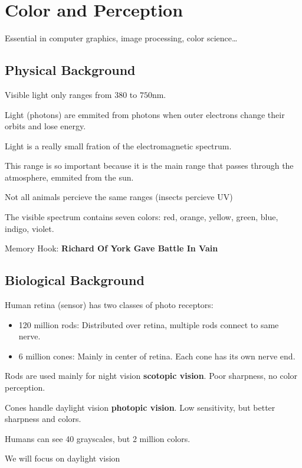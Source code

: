 \documentclass{article}
\begin{document}

\section{Color and Perception}

Essential in computer graphics, image processing, color science\dots

\subsection{Physical Background}

Visible light only ranges from $380$ to $750$nm.

Light (photons) are emmited from photons when outer electrons change their orbits and lose energy.

Light is a really small fration of the electromagnetic spectrum.

This range is so important because it is the main range that passes through the atmosphere, emmited from the sun.

Not all animals percieve the same ranges (insects percieve UV)

The visible spectrum contains seven colors: red, orange, yellow, green, blue, indigo, violet.

Memory Hook: \textbf{Richard Of York Gave Battle In Vain}

\subsection{Biological Background}

Human retina (sensor) has two classes of photo receptors:
\begin{itemize}
  \item 120 million rods: Distributed over retina, multiple rods connect to same nerve.
  \item 6 million cones: Mainly in center of retina. Each cone has its own nerve end.
\end{itemize}

Rods are used mainly for night vision \textbf{scotopic vision}. Poor sharpness, no color perception.

Cones handle daylight vision \textbf{photopic vision}. Low sensitivity, but better sharpness and colors.

Humans can see 40 grayscales, but 2 million colors.

We will focus on daylight vision
\end{document}
